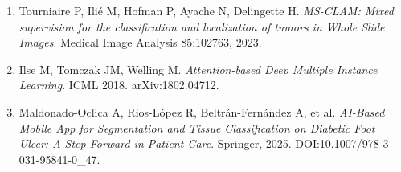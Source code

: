 \documentclass[12pt,letterpaper]{article}
\begin{document}
\begin{enumerate}[leftmargin=1.4em]
{        challenge report: Benchmark and analysis}. Medical Image Analysis 94:103153, 2024.
  \item Tourniaire P, Ilié M, Hofman P, Ayache N, Delingette H. \textit{MS-CLAM: Mixed supervision
        for the classification and localization of tumors in Whole Slide Images}. Medical Image
        Analysis 85:102763, 2023.
  \item Ilse M, Tomczak JM, Welling M. \textit{Attention-based Deep Multiple Instance Learning}.
        ICML 2018. arXiv:1802.04712.
  \item Maldonado-Oclica A, Rios-López R, Beltrán-Fernández A, et al. \textit{AI-Based Mobile App for
        Segmentation and Tissue Classification on Diabetic Foot Ulcer: A Step Forward in Patient
        Care}. Springer, 2025. DOI:10.1007/978-3-031-95841-0\_47.
\end{enumerate}
\end{document}
